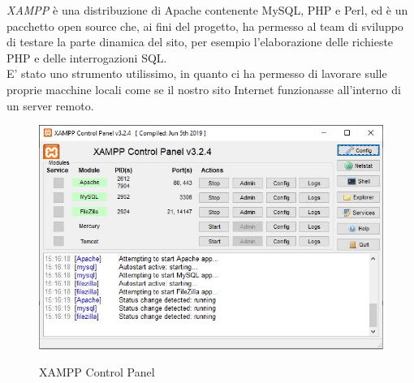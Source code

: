 ﻿\emph{XAMPP} è una distribuzione di Apache contenente MySQL, PHP e Perl, ed è un pacchetto open source che, ai fini del progetto, ha permesso
al team di sviluppo di testare la parte dinamica del sito, per esempio l'elaborazione delle richieste PHP e delle interrogazioni SQL.\\
E' stato uno strumento utilissimo, in quanto ci ha permesso di lavorare sulle proprie macchine locali come se il nostro sito Internet funzionasse
all'interno di un server remoto.
\begin{figure}[!h]
	\centering
	\includegraphics[width=0.7\linewidth]{sezioni/FaseTest/Immagini/xampp.JPG}\\
	\caption{XAMPP Control Panel}
	\label{Fig:xampp}
\end{figure} 